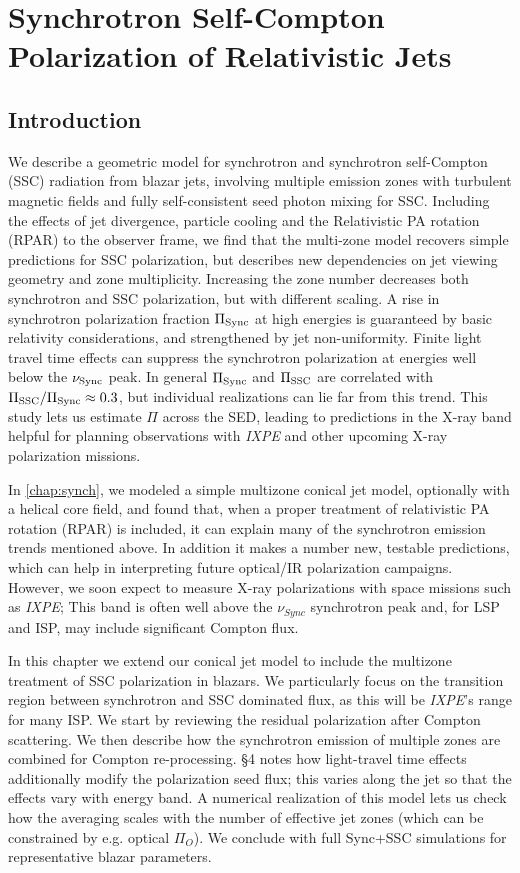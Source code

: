 \chapter{Synchrotron Self-Compton Polarization of Relativistic Jets}
\label{chap:ssc}

\section{Introduction}
We describe a geometric model for synchrotron and synchrotron self-Compton (SSC) radiation from blazar jets, involving multiple emission zones with turbulent magnetic fields and fully self-consistent seed photon mixing for SSC. Including the effects of jet divergence, particle cooling and the Relativistic PA rotation (RPAR) to the observer frame, we find that the multi-zone model recovers simple predictions for SSC polarization, but describes new dependencies on jet viewing geometry and zone multiplicity. Increasing the zone number decreases both synchrotron and SSC polarization, but with different scaling. A rise in synchrotron polarization fraction $\Pi_{\rm Sync}$ at high energies is guaranteed by basic relativity considerations, and strengthened by jet non-uniformity. Finite light travel time effects can suppress the synchrotron polarization at energies well below the $\nu_{\rm Sync}$ peak. In general $\Pi_{\rm Sync}$ and $\Pi_{\rm SSC}$ are correlated with $\Pi_{\rm SSC}/\Pi_{\rm Sync}\approx 0.3$, but individual realizations can lie far from this trend. This study lets us estimate $\Pi$ across the SED, leading to predictions in the X-ray band helpful for planning observations with {\it IXPE} and other upcoming X-ray polarization missions.

In \cref{chap:synch}, we modeled a simple multizone conical jet model, optionally with a helical core field, and found that, when a proper treatment of relativistic PA rotation (RPAR) is included, it can explain many of the synchrotron emission trends mentioned above.
In addition it makes a number new, testable predictions, which can help in interpreting future optical/IR polarization campaigns. However, we soon expect to measure X-ray polarizations with space missions such as {\it IXPE}; This band is often well above the $\nu_{Sync}$ synchrotron peak and, for LSP and ISP, may include significant Compton flux. 

In this chapter we extend our conical jet model to include the multizone treatment of SSC polarization in blazars. We particularly focus on the transition region between synchrotron and SSC dominated flux, as this will be {\it IXPE}'s range for many ISP. We start by reviewing the residual polarization after Compton scattering. We then describe how the synchrotron emission of multiple zones are combined for Compton re-processing. \S4 notes how light-travel time effects additionally modify the polarization seed flux; this varies along the jet so that the effects vary with energy band. A numerical realization of this model lets us check how the averaging scales with the number of effective jet zones (which can be constrained by e.g. optical $\Pi_O$).  We conclude with full Sync+SSC simulations for representative blazar parameters.

